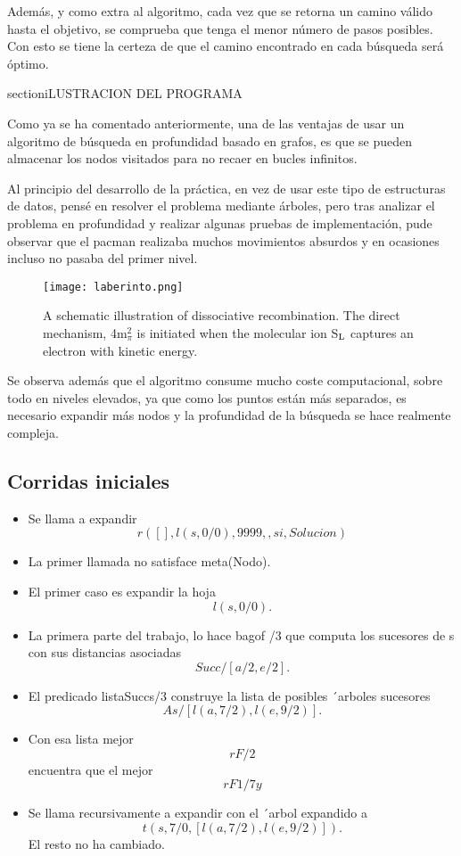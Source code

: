 \documentclass[letterpaper, 10 pt, conference]{ieeeconf}  %
\begin{document}
Además, y como extra al algoritmo, cada vez que se retorna un camino válido hasta el objetivo, se comprueba que tenga el menor número de pasos posibles. Con esto se tiene la certeza de que el camino encontrado en cada búsqueda será óptimo.

section{iLUSTRACION DEL PROGRAMA}

Como ya se ha comentado anteriormente, una de las ventajas de usar un algoritmo de búsqueda en profundidad basado en grafos, es que se pueden almacenar los nodos visitados para no recaer en bucles infinitos. 

Al principio del desarrollo de la práctica, en vez de usar este tipo de estructuras de datos, pensé en resolver el problema mediante árboles, pero tras analizar el problema en profundidad y realizar algunas pruebas de implementación, pude observar que el pacman realizaba muchos movimientos absurdos y en ocasiones incluso no pasaba del primer nivel.


\begin{figure}[bh] 
\centerline{\texttt{[image: laberinto.png]}} %
\vspace*{8pt}
\caption{A schematic illustration of dissociative recombination. The
direct mechanism, 4m$^2_\pi$ is initiated when the
molecular ion S$_{\rm L}$ captures an electron with kinetic energy.}
\end{figure}

Se observa además que el algoritmo consume mucho coste computacional, sobre todo en niveles elevados, ya que como los puntos están más separados, es necesario expandir más nodos y la profundidad de la búsqueda se hace realmente compleja.

\subsection{Corridas iniciales}
\begin{itemize}


\item Se llama a expandir $$r([], l(s, 0/0), 9999,, si, Solucion)$$
\item La primer llamada no satisface meta(Nodo).
\item El primer caso es expandir la hoja$$ l(s, 0/0). $$
\item La primera parte del trabajo, lo hace bagof /3 que computa los sucesores de s con sus distancias asociadas$$ Succ/[a/2, e/2].$$
\item El predicado listaSuccs/3 construye la lista de posibles ´arboles
sucesores $$As/[l(a, 7/2), l(e, 9/2)].$$ 
\item Con esa lista mejor $$ rF/2 $$ encuentra que el mejor $$ r F1/7 y $$
\item Se llama recursivamente a expandir con el ´arbol expandido a $$  t(s, 7/0, [l(a, 7/2), l(e, 9/2)]).$$ El resto no ha cambiado.

\end{itemize}
\end{document}
